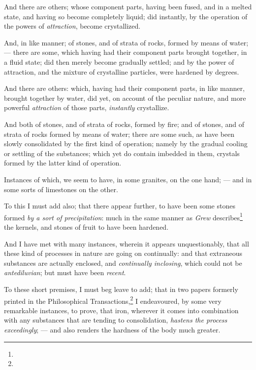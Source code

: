 \documentclass[a4paper, 12pt, oneside, twocolumn]{article}
\begin{document}
And there are others; whose component parts, having been fused, and in a melted state, and having so become completely liquid; did instantly, by the operation of the powers of \emph{attraction}, become crystallized.

And, in like manner; of stones, and of strata of rocks, formed by means of water; --- there are some, which having had their component parts brought together, in a fluid state; did then merely become gradually settled; and by the power of attraction, and the mixture of crystalline particles, were hardened by degrees.

And there are others: which, having had their component parts, in like manner, brought together by water, did yet, on account of the peculiar nature, and more powerful \emph{attraction} of those parts, \emph{instantly} crystallize.

And both of stones, and of strata of rocks, formed by fire; and of stones, and of strata of rocks formed by means of water; there are some such, as have been slowly consolidated by the first kind of operation; namely by the gradual cooling or settling of the substances; which yet do contain imbedded in them, crystals formed by the latter kind of operation.

Instances of which, we seem to have, in some granites, on the one hand; --- and in some sorts of limestones on the other.

To this I must add also; that there appear further, to have been some stones formed \emph{by a sort of precipitation}: much in the same manner as \emph{Grew} describes\footnote{} the kernels, and stones of fruit to have been hardened.

And I have met with many instances, wherein it appears unquestionably, that all these kind of processes in nature are going on continually: and that extraneous substances are actually enclosed, and \emph{continually inclosing}, which could not be \emph{antediluvian}; but must have been \emph{recent}.

To these short premises, I must beg leave to add; that in two papers formerly printed in the Philosophical Transactions,\footnote{} I endeavoured, by some very remarkable instances, to prove, that iron, wherever it comes into combination with any substances that are tending to consolidation, \emph{hastens the process exceedingly}; --- and also renders the hardness of the body much greater.
\end{document}

